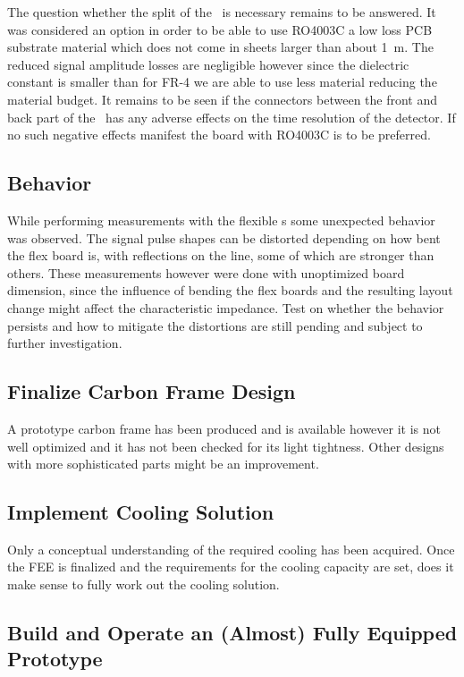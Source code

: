 \documentclass[../BTOF_summary.tex]{subfiles}
\begin{document}
The question whether the split of the \railboard\ is necessary remains to be answered.
It was considered an option in order to be able to use RO4003C a low loss PCB substrate material which does not come in sheets larger than about \SI{1}{m}.
The reduced signal amplitude losses are negligible however since the dielectric constant is smaller than for FR-4 we are able to use less material reducing the material budget.
It remains to be seen if the connectors between the front and back part of the \railboard\ has any adverse effects on the time resolution of the detector.
If no such negative effects manifest the board with RO4003C is to be preferred.

\subsection{\sensorboard Behavior}

While performing measurements with the flexible \sensorboard s some unexpected behavior was observed.
The signal pulse shapes can be distorted depending on how bent the flex board is, with reflections on the line, some of which are stronger than others.
These measurements however were done with unoptimized board dimension, since the influence of bending the flex boards and the resulting layout change might affect the characteristic impedance.
Test on whether the behavior persists and how to mitigate the distortions are still pending and subject to further investigation.

\subsection{Finalize Carbon Frame Design}
A prototype carbon frame has been produced and is available however it is not well optimized and it has not been checked for its light tightness.
Other designs with more sophisticated parts might be an improvement.

\subsection{Implement Cooling Solution}
Only a conceptual understanding of the required cooling has been acquired.
Once the FEE is finalized and the requirements for the cooling capacity are set, does it make sense to fully work out the cooling solution.

\subsection{Build and Operate an (Almost) Fully Equipped Prototype}
\end{document}
